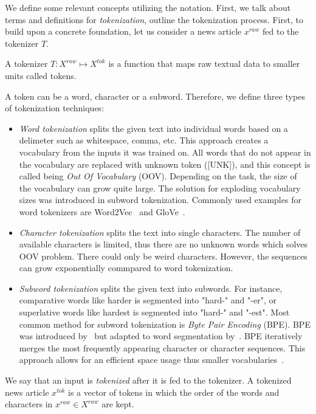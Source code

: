 We define some relevant concepts utilizing the notation. First, we talk about terms and definitions for \emph{tokenization}, outline the tokenization process. First, to build upon a concrete foundation, let us consider a news article $x^{raw}$ fed to the tokenizer $T$.
\begin{definition}
    A tokenizer $T:X^{raw} \mapsto X^{tok}$ is a function that maps raw textual data to smaller units called tokens.
\end{definition}
A token can be a word, character or a subword. Therefore, we define three types of tokenization techniques:
\begin{itemize}
    \item \emph{Word tokenization} splits the given text into individual words based on a delimeter such as whitespace, comma, etc. This approach creates a vocabulary from the inputs it was trained on. All words that do not appear in the vocabulary are replaced with unknown token ([UNK]), and this concept is called being \emph{Out Of Vocabulary} (OOV). Depending on the task, the size of the vocabulary can grow quite large. The solution for exploding vocabulary sizes was introduced in subword tokenization. Commonly used examples for word tokenizers are Word2Vec~\parencite{Word2Vec_Mikolov} and GloVe~\parencite{GloVe_Pennington}.
    \item \emph{Character tokenization} splits the text into single characters. The number of available characters is limited, thus there are no unknown words which solves OOV problem. There could only be weird characters. However, the sequences can grow exponentially commpared to word tokenization.
    \item \emph{Subword tokenization} splits the given text into subwords. For instance, comparative words like harder is segmented into "hard-" and "-er", or superlative words like hardest is segmented into "hard-" and "-est". Most common method for subword tokenization is \emph{Byte Pair Encoding} (BPE). BPE was introduced by~\cite{ANewAlgorithmForDataCompression_Gage} but adapted to word segmentation by~\cite{NeuralMachineTranslationOfRareWords_Sennrich}. BPE iteratively merges the most frequently appearing character or character sequences. This approach allows for an efficient space usage thus smaller vocabularies~\parencite{NeuralMachineTranslationOfRareWords_Sennrich}.
\end{itemize}
We say that an input is \emph{tokenized} after it is fed to the tokenizer. A tokenized news article $x^{tok}$ is a vector of tokens in which the order of the words and characters in $x^{raw} \in X^{raw}$ are kept.
